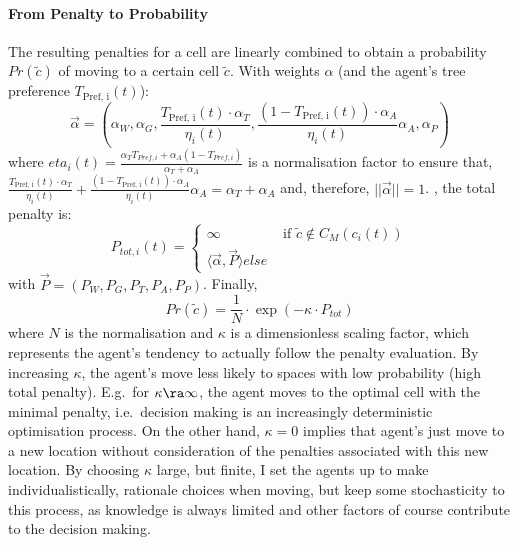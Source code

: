 \paragraph{From Penalty to Probability}
The resulting penalties for a cell are linearly combined to obtain a probability $Pr(\tilde{c})$ of moving to a certain cell $\tilde{c}$.
With weights $\alpha$ (and the agent's tree preference $T_\text{Pref, i}(t)$):
\begin{equation}
\vec{\alpha} = (\alpha_W, \alpha_G, \frac{T_\text{Pref, i}(t) \cdot \alpha_T}{\eta_i(t)}, \frac{(1-T_\text{Pref, i}(t))\cdot \alpha_A}{\eta_i(t)} \alpha_A, \alpha_P)
\end{equation} 
where $eta_i(t) = \frac{\alpha_T T_{Pref, i}+ \alpha_A (1-T_{Pref, i})}{\alpha_T+\alpha_A}$ is a normalisation factor to ensure that, $\frac{T_\text{Pref, i}(t) \cdot \alpha_T}{\eta_i(t)} + \frac{(1-T_\text{Pref, i}(t))\cdot \alpha_A}{\eta_i(t)} \alpha_A = \alpha_T + \alpha_A$ and, therefore, $||\vec{\alpha}||=1$. 
, the total penalty is:
\begin{equation}
P_{tot, i}(t) =  \begin{cases} \infty & \text{ if } \tilde{c}\notin C_M(c_i(t))\\
	 \langle \vec{\alpha}{, } \vec{P} \rangle { else}
	 \end{cases}
\end{equation}
with $\vec{P} = (P_W, P_G, P_T, P_A, P_P)$.
Finally, 
\begin{equation}
	Pr(\tilde{c})  = \frac{1}{N} \cdot \exp \left( - \kappa \cdot P_{tot} \right) 
\end{equation}
\TODO
where $N$ is the normalisation and $\kappa$ is a dimensionless scaling factor, which represents the agent's tendency to actually follow the penalty evaluation. 
By increasing $\kappa$, the agent's move less likely to spaces with low probability (high total penalty). 
E.g.\ for $\kappa\ra \infty$, the agent moves to the optimal cell with the minimal penalty, i.e.\ decision making is an increasingly deterministic optimisation process\footnotemark.
On the other hand, $\kappa=0$ implies that agent's just move to a new location without consideration of the penalties associated with this new location.
By choosing $\kappa$ large, but finite, I set the agents up to make individualistically, rationale choices when moving, but keep some stochasticity to this process, as knowledge is always limited and other factors of course contribute to the decision making.

